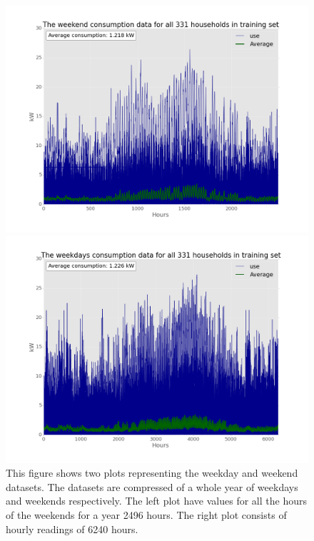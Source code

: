 \begin{figure}[H]
	\centering
	\begin{minipage}{.5\textwidth}
		\centering
		\includegraphics[scale=0.19]{./figures/weekendhouseuse}
	\end{minipage}%
	\begin{minipage}{.5\textwidth}
		\centering
		\includegraphics[scale=0.19]{./figures/weekdayshouseuse}
	\end{minipage}
	\caption{This figure shows two plots representing the weekday and weekend datasets. The datasets are compressed of a whole year of weekdays and weekends respectively. The left plot have values for all the hours of the weekends for a year 2496 hours. The right plot consists of hourly readings of 6240 hours.}
	\label{fig:weekend_day}
\end{figure}

